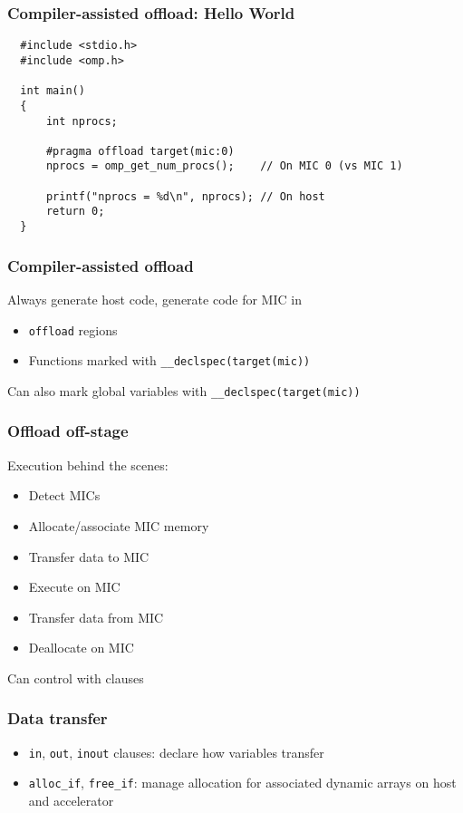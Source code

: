 \documentclass{beamer}
\begin{document}
\begin{frame}[fragile]
  \frametitle{Compiler-assisted offload: Hello World}

\begin{lstlisting}
  #include <stdio.h>
  #include <omp.h>

  int main()
  {
      int nprocs;

      #pragma offload target(mic:0)
      nprocs = omp_get_num_procs();    // On MIC 0 (vs MIC 1)

      printf("nprocs = %d\n", nprocs); // On host
      return 0;
  }
\end{lstlisting}
\end{frame}


\begin{frame}
  \frametitle{Compiler-assisted offload}

  Always generate host code, generate code for MIC in
  \begin{itemize}
  \item {\tt offload} regions
  \item Functions marked with {\tt \_\_declspec(target(mic))}
  \end{itemize}
  Can also mark global variables with {\tt \_\_declspec(target(mic))}
\end{frame}


\begin{frame}
  \frametitle{Offload off-stage}

  Execution behind the scenes:
  \begin{itemize}
  \item Detect MICs
  \item Allocate/associate MIC memory
  \item Transfer data to MIC
  \item Execute on MIC
  \item Transfer data from MIC
  \item Deallocate on MIC
  \end{itemize}
  Can control with clauses
\end{frame}


\begin{frame}
  \frametitle{Data transfer}

  \begin{itemize}
  \item {\tt in}, {\tt out}, {\tt inout} clauses: declare how
    variables transfer
  \item {\tt alloc\_if}, {\tt free\_if}: manage allocation for associated dynamic
    arrays on host and accelerator
  \end{itemize}
\end{frame}
\end{document}

